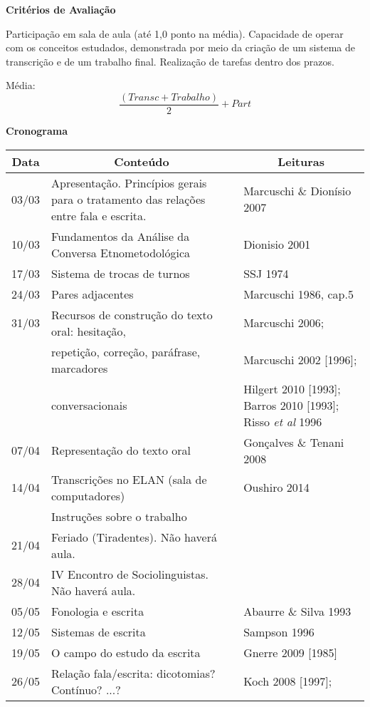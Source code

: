 \documentclass[a4paper,12pt]{article}
\newcommand{\n}{\noindent}
\begin{document}
{\bigskip
\n \textbf{Critérios de Avaliação} \bigskip

\n Participação em sala de aula (até 1,0 ponto na média). Capacidade de operar com os conceitos estudados, demonstrada por meio da criação de um sistema de transcrição e de um trabalho final. Realização de tarefas dentro dos prazos.\medskip

\n Média: \[\frac{(Transc + Trabalho)}{2} + Part\]

\pagebreak
\n \textbf{Cronograma}

\begin{center}
\begin{tabular}{rp{9cm}p{5cm}}
	\hline
	\multicolumn{1}{c}{\textbf{Data}} & \multicolumn{1}{c}{\textbf{Conteúdo}} & \multicolumn{1}{c}{\textbf{Leituras}} \\ \hline
03/03 & Apresentação. Princípios gerais para o tratamento das relações entre fala e escrita. & Marcuschi \& Dionísio 2007 \\ 
\rowcolor[gray]{0.9}10/03 & Fundamentos da Análise da Conversa \mbox{Etnometodológica} & Dionisio 2001 \\ 
17/03 & Sistema de trocas de turnos & SSJ 1974 \\ 
\rowcolor[gray]{0.9}24/03 & Pares adjacentes & Marcuschi 1986, cap.5 \\ 
31/03 & Recursos de construção do texto oral: hesitação,  & Marcuschi 2006; \\ 
 & repetição, correção, paráfrase, marcadores  & Marcuschi 2002 [1996];  \\ 
 & conversacionais  & Hilgert 2010 [1993]; Barros 2010 [1993]; Risso \textit{et al} 1996\\
\rowcolor[gray]{0.9}07/04 & Representação do texto oral & Gonçalves \& Tenani 2008 \\
14/04 & Transcrições no ELAN (sala de computadores) & Oushiro 2014\\
      & Instruções sobre o trabalho & \\
\rowcolor[gray]{0.9}21/04 & Feriado (Tiradentes). Não haverá aula. & \\
28/04 & IV Encontro de Sociolinguistas. Não haverá aula. & \\
\rowcolor[gray]{0.9}05/05 & Fonologia e escrita & Abaurre \& Silva 1993\\
12/05 & Sistemas de escrita & Sampson 1996 \\ 
\rowcolor[gray]{0.9}19/05 & O campo do estudo da escrita & Gnerre 2009 [1985] \\ 
26/05 & Relação fala/escrita: dicotomias? Contínuo? ...? & Koch 2008 [1997]; \\ 

\end{tabular}
\end{center}}
\end{document}
